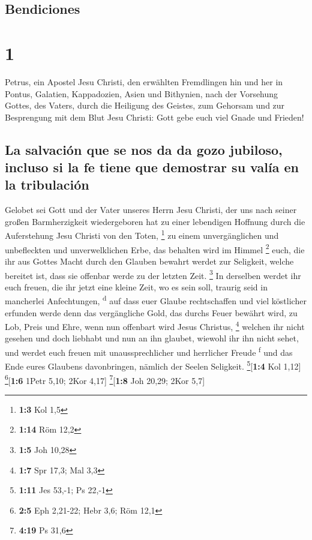 \hypertarget{bendiciones}{%
\subsection{Bendiciones}\label{bendiciones}}

\hypertarget{section}{%
\section{1}\label{section}}

 Petrus, ein Apostel Jesu Christi, den erwählten
Fremdlingen hin und her in Pontus, Galatien, Kappadozien, Asien und
Bithynien,  nach der Vorsehung Gottes, des Vaters, durch
die Heiligung des Geistes, zum Gehorsam und zur Besprengung mit dem Blut
Jesu Christi: Gott gebe euch viel Gnade und Frieden!

\hypertarget{la-salvaciuxf3n-que-se-nos-da-da-gozo-jubiloso-incluso-si-la-fe-tiene-que-demostrar-su-valuxeda-en-la-tribulaciuxf3n}{%
\subsection{La salvación que se nos da da gozo jubiloso, incluso si la
fe tiene que demostrar su valía en la
tribulación}\label{la-salvaciuxf3n-que-se-nos-da-da-gozo-jubiloso-incluso-si-la-fe-tiene-que-demostrar-su-valuxeda-en-la-tribulaciuxf3n}}

 Gelobet sei Gott und der Vater unseres Herrn Jesu
Christi, der uns nach seiner großen Barmherzigkeit wiedergeboren hat zu
einer lebendigen Hoffnung durch die Auferstehung Jesu Christi von den
Toten, \footnote{\textbf{1:3} Kol 1,5}  zu einem
unvergänglichen und unbefleckten und unverwelklichen Erbe, das behalten
wird im Himmel \footnote{\textbf{1:14} Röm 12,2}  euch,
die ihr aus Gottes Macht durch den Glauben bewahrt werdet zur Seligkeit,
welche bereitet ist, dass sie offenbar werde zu der letzten Zeit.
\footnote{\textbf{1:5} Joh 10,28}  In derselben werdet ihr
euch freuen, die ihr jetzt eine kleine Zeit, wo es sein soll, traurig
seid in mancherlei Anfechtungen, \textsuperscript{d}  auf
dass euer Glaube rechtschaffen und viel köstlicher erfunden werde denn
das vergängliche Gold, das durchs Feuer bewährt wird, zu Lob, Preis und
Ehre, wenn nun offenbart wird Jesus Christus, \footnote{\textbf{1:7} Spr
  17,3; Mal 3,3}  welchen ihr nicht gesehen und doch
liebhabt und nun an ihn glaubet, wiewohl ihr ihn nicht sehet, und werdet
euch freuen mit unaussprechlicher und herrlicher Freude
\textsuperscript{f}  und das Ende eures Glaubens
davonbringen, nämlich der Seelen Seligkeit. \footnote{\textbf{1:11} Jes
  53,-1; Ps 22,-1}{[}\textbf{1:4} Kol 1,12{]} \footnote{\textbf{2:5} Eph
  2,21-22; Hebr 3,6; Röm 12,1}{[}\textbf{1:6} 1Petr 5,10; 2Kor 4,17{]}
\footnote{\textbf{4:19} Ps 31,6}{[}\textbf{1:8} Joh 20,29; 2Kor 5,7{]}

